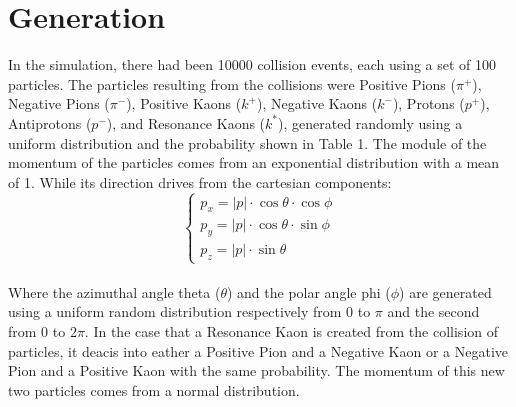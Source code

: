 \documentclass[a4paper, 11pt]{article}
\begin{document}
    \section{Generation}
      In the simulation, there had been 10000 collision events, each using a set of 100 particles. The particles resulting from the collisions were Positive Pions ($\pi^+$), Negative Pions ($\pi^-$), Positive Kaons ($k^+$), Negative Kaons ($k^-$), Protons ($p^+$), Antiprotons ($p^-$), and Resonance Kaons ($k^*$), generated randomly using a uniform distribution and the probability shown in Table 1.  The module of the momentum of the particles comes from an exponential distribution with a mean of 1. While its direction drives from the cartesian components:
      \begin{equation}
        \begin{cases}
          p_x = |p| \cdot \cos \theta \cdot \cos \phi\\
          p_y = |p| \cdot \cos \theta \cdot \sin \phi\\
          p_z = |p| \cdot \sin \theta
        \end{cases}
      \end{equation}\\
      Where the azimuthal angle theta ($\theta$) and the polar angle phi ($\phi$) are generated using a uniform random distribution respectively from 0 to $\pi$ and the second from 0 to $2\pi$.
      In the case that a Resonance Kaon is created from the collision of particles, it deacis into eather a Positive Pion and a Negative Kaon or a Negative Pion and a Positive Kaon with the same probability. The momentum of this new two particles comes from a normal distribution.
\end{document}
